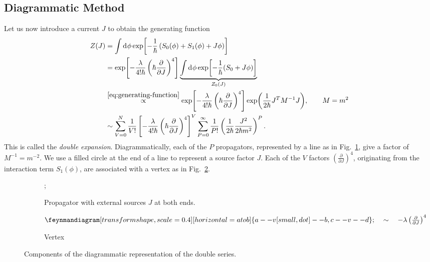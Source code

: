 \subsection{Diagrammatic Method}%
\label{sub:diagrammatic_method}

Let us now introduce a current $J$ to obtain the generating function
\begin{align}
  Z(J) &= \int \dd[]{\phi} \exp[-\frac{1}{\hbar} \left( S_0(\phi) + S_1 (\phi) + J \phi \right)] \\
       &= \exp[-\frac{\lambda}{4! \hbar} \left( \hbar \frac{\partial }{\partial J} \right)^4] \underbrace{\int \dd[]{\phi} \exp[-\frac{1}{\hbar} (S_0 + J \phi)]}_{\mathclap{Z_0 (J)}} \\
       &\stackrel{\eqref{eq:generating-function}}{\propto} \exp[-\frac{\lambda}{4! \hbar} \left( \hbar \frac{\partial }{\partial J} \right)^4] \exp(\frac{1}{2\hbar} J^T M^{-1} J), \qquad M = m^2 \\
       &\sim \sum_{V=0}^N \frac{1}{V!} \left[ -\frac{\lambda}{4! \hbar} \left( \hbar \frac{\partial }{\partial J} \right)^4 \right]^V 
       \sum_{P=0}^\infty \frac{1}{P!} \left( \frac{1}{2\hbar} \frac{J^2}{2 \hbar m^2} \right)^P \label{eq:3-star}.
\end{align}
This is called the \emph{double expansion}.
Diagrammatically, each of the $P$ propagators, represented by a line as in Fig.~\ref{fig:l3f1a}, give a factor of $M^{-1} = m^{-2}$.  We use a filled circle at the end of a line to represent a source factor $J$.
Each of the $V$ factors $\left( \frac{\partial }{\partial J} \right)^4$, originating from the interaction term $S_1(\phi)$, are associated with a vertex as in Fig.~\ref{fig:l3f1b}.

\begin{figure}[tbph]
  \centering
  \begin{subfigure}[t]{0.5\textwidth}
    \centering
    ;
    \caption{Propagator with external sources $J$ at both ends.}
    \label{fig:l3f1a}
  \end{subfigure}%
  \begin{subfigure}[t]{0.5\textwidth}
    \centering
    $ \begin{gathered}
      \feynmandiagram[transform shape, scale=0.4][horizontal=a to b] {
        a -- v [small, dot] --b,
        c -- v -- d
      };
    \end{gathered} \quad \sim \quad
    -\lambda \left( \frac{\partial }{\partial J} \right)^4$ 
    \caption{Vertex}
    \label{fig:l3f1b}
  \end{subfigure}
  \caption{Components of the diagrammatic representation of the double series.}
  \label{fig:l3f1}
\end{figure}


